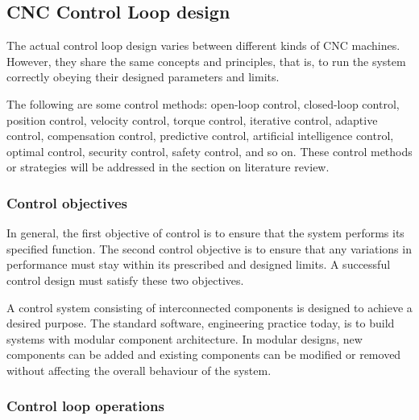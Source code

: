 \justifying

%

\subsection{CNC Control Loop design}

The actual control loop design varies between different kinds of CNC machines. However, they share the same concepts and principles, that is, to run the system correctly obeying their designed parameters and limits. 
\vspace*{1\baselineskip}

The following are some control methods: open-loop control, closed-loop control, position control, velocity control, torque control, iterative control, adaptive control, compensation control, predictive control, artificial intelligence control, optimal control, security control, safety control, and so on. These control methods or strategies will be addressed in the section on literature review. 

\subsubsection{Control objectives}

In general, the first objective of control is to ensure that the system performs its specified function. The second control objective is to ensure that any variations in performance must stay within its prescribed and designed limits. A successful control design must satisfy these two objectives. 
\vspace*{1\baselineskip}

A control system consisting of interconnected components is designed to achieve a desired purpose. The standard software, engineering practice today, is to build systems with modular component architecture. In modular designs, new components can be added and existing components can be modified or removed without affecting the overall behaviour of the system. 

\subsubsection{Control loop operations}

